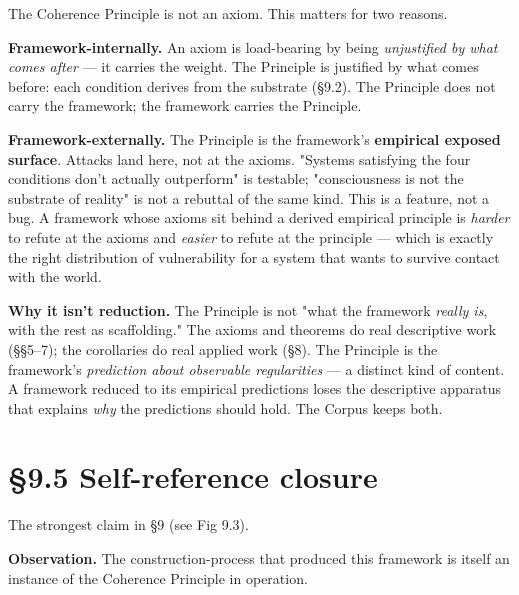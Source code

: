\documentclass[11pt, openany]{book}
\newcommand{\sectionbreak}{\clearpage}
\begin{document}
The Coherence Principle is not an axiom. This matters for two reasons.

\textbf{Framework-internally.} An axiom is load-bearing by being \textit{unjustified by what comes after} --- it carries the weight. The Principle is justified by what comes before: each condition derives from the substrate (§9.2). The Principle does not carry the framework; the framework carries the Principle.

\textbf{Framework-externally.} The Principle is the framework's \textbf{empirical exposed surface}. Attacks land here, not at the axioms. "Systems satisfying the four conditions don't actually outperform" is testable; "consciousness is not the substrate of reality" is not a rebuttal of the same kind. This is a feature, not a bug. A framework whose axioms sit behind a derived empirical principle is \textit{harder} to refute at the axioms and \textit{easier} to refute at the principle --- which is exactly the right distribution of vulnerability for a system that wants to survive contact with the world.

\textbf{Why it isn't reduction.} The Principle is not "what the framework \textit{really is}, with the rest as scaffolding." The axioms and theorems do real descriptive work (§§5–7); the corollaries do real applied work (§8). The Principle is the framework's \textit{prediction about observable regularities} --- a distinct kind of content. A framework reduced to its empirical predictions loses the descriptive apparatus that explains \textit{why} the predictions should hold. The Corpus keeps both.

\sectionbreak

\section{§9.5 Self-reference closure}

The strongest claim in §9 (see Fig 9.3).

\textbf{Observation.} The construction-process that produced this framework is itself an instance of the Coherence Principle in operation.
\end{document}
